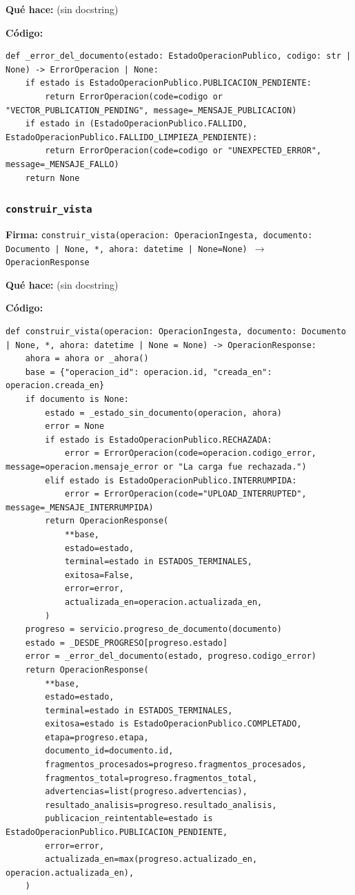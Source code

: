 \documentclass[11pt,a4paper]{article}
\begin{document}
\textbf{Qué hace:} (sin docstring)

\textbf{Código:}
\begin{lstlisting}
def _error_del_documento(estado: EstadoOperacionPublico, codigo: str | None) -> ErrorOperacion | None:
    if estado is EstadoOperacionPublico.PUBLICACION_PENDIENTE:
        return ErrorOperacion(code=codigo or "VECTOR_PUBLICATION_PENDING", message=_MENSAJE_PUBLICACION)
    if estado in (EstadoOperacionPublico.FALLIDO, EstadoOperacionPublico.FALLIDO_LIMPIEZA_PENDIENTE):
        return ErrorOperacion(code=codigo or "UNEXPECTED_ERROR", message=_MENSAJE_FALLO)
    return None
\end{lstlisting}

\subsubsection*{\texttt{construir\_vista}}
\textbf{Firma:} \texttt{construir\_vista(operacion: OperacionIngesta, documento: Documento | None, *, ahora: datetime | None=None) $\rightarrow$ OperacionResponse}

\textbf{Qué hace:} (sin docstring)

\textbf{Código:}
\begin{lstlisting}
def construir_vista(operacion: OperacionIngesta, documento: Documento | None, *, ahora: datetime | None = None) -> OperacionResponse:
    ahora = ahora or _ahora()
    base = {"operacion_id": operacion.id, "creada_en": operacion.creada_en}
    if documento is None:
        estado = _estado_sin_documento(operacion, ahora)
        error = None
        if estado is EstadoOperacionPublico.RECHAZADA:
            error = ErrorOperacion(code=operacion.codigo_error, message=operacion.mensaje_error or "La carga fue rechazada.")
        elif estado is EstadoOperacionPublico.INTERRUMPIDA:
            error = ErrorOperacion(code="UPLOAD_INTERRUPTED", message=_MENSAJE_INTERRUMPIDA)
        return OperacionResponse(
            **base,
            estado=estado,
            terminal=estado in ESTADOS_TERMINALES,
            exitosa=False,
            error=error,
            actualizada_en=operacion.actualizada_en,
        )
    progreso = servicio.progreso_de_documento(documento)
    estado = _DESDE_PROGRESO[progreso.estado]
    error = _error_del_documento(estado, progreso.codigo_error)
    return OperacionResponse(
        **base,
        estado=estado,
        terminal=estado in ESTADOS_TERMINALES,
        exitosa=estado is EstadoOperacionPublico.COMPLETADO,
        etapa=progreso.etapa,
        documento_id=documento.id,
        fragmentos_procesados=progreso.fragmentos_procesados,
        fragmentos_total=progreso.fragmentos_total,
        advertencias=list(progreso.advertencias),
        resultado_analisis=progreso.resultado_analisis,
        publicacion_reintentable=estado is EstadoOperacionPublico.PUBLICACION_PENDIENTE,
        error=error,
        actualizada_en=max(progreso.actualizado_en, operacion.actualizada_en),
    )
\end{lstlisting}
\end{document}
